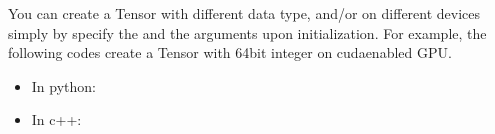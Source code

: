 \documentclass[letterpaper,10pt,english]{sphinxmanual}
\begin{document}
You can create a Tensor with different data type, and/or on different devices simply by specify the  and the  arguments upon initialization. For example, the following codes create a Tensor with 64bit integer on cuda\sphinxhyphen{}enabled GPU.
\begin{itemize}
\item {} 
In python:

\end{itemize}

\begin{sphinxVerbatim}[commandchars=\\\{\}]
  \PYG{p}{[}\PYG{p}{]}
\end{sphinxVerbatim}
\begin{itemize}
\item {} 
In c++:

\end{itemize}

\begin{sphinxVerbatim}[commandchars=\\\{\}]
   
\end{sphinxVerbatim}
\end{document}
